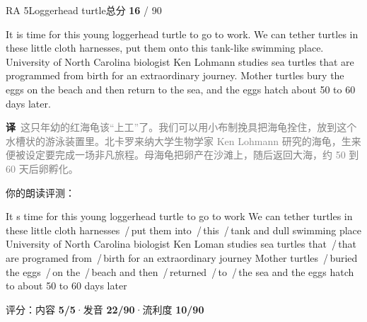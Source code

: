 \documentclass[11pt]{article}
\newcommand{\sfull}[1]{\textcolor{cFix}{\bfseries #1}}     %
\newcommand{\spart}[1]{\textcolor{cPartial}{\bfseries #1}} %
\newcommand{\szero}[1]{\textcolor{cWrong}{\bfseries #1}}   %
\newcommand{\sg}[1]{\textcolor{cSpkGood}{#1}}   %
\newcommand{\sy}[1]{\textcolor{cSpkOk}{#1}}     %
\newcommand{\sr}[1]{\textcolor{cSpkBad}{#1}}    %
\newcommand{\pse}{{\color{gray}\,/\,}}          %
\newcommand{\zh}[1]{{\footnotesize\textcolor{cNote}{\textbf{译}}\ \textcolor{gray}{#1}}}
\begin{document}
\begin{qblock}{RA 5\quad Loggerhead turtle}{总分 \textcolor{cAccent}{\bfseries 16} / 90}
\begin{promptbox}
It is time for this young loggerhead turtle to go to work. We can tether turtles in these little cloth harnesses, put them onto this tank-like swimming place. University of North Carolina biologist Ken Lohmann studies sea turtles that are programmed from birth for an extraordinary journey. Mother turtles bury the eggs on the beach and then return to the sea, and the eggs hatch about 50 to 60 days later.
\end{promptbox}
\zh{这只年幼的红海龟该“上工”了。我们可以用小布制挽具把海龟拴住，放到这个水槽状的游泳装置里。北卡罗来纳大学生物学家 Ken Lohmann 研究的海龟，生来便被设定要完成一场非凡旅程。母海龟把卵产在沙滩上，随后返回大海，约 50 到 60 天后卵孵化。}
\smallskip\par{\footnotesize\color{gray}你的朗读评测：}
\begin{asrbox}
\sy{It s time for this young} \sy{loggerhead} \sg{turtle to go to work} \sg{We can} \sr{tether} \sg{turtles in these little} \sy{cloth harnesses} \pse \sy{put them into} \pse \sy{this} \pse \sy{tank and dull} \sg{swimming place University of} \sg{North Carolina biologist Ken Loman} \sg{studies} \sg{sea turtles that} \pse \sy{that are programed from} \pse \sg{birth for an} \sg{extraordinary journey Mother turtles} \pse \sy{buried the} \sg{eggs} \pse \sg{on the} \pse \sg{beach and then} \pse \sr{returned} \pse \sg{to} \pse \sg{the sea and the eggs hatch to} \sg{about 50 to 60 days later}
\end{asrbox}
{\small 评分：内容 \sfull{5/5}\quad·\quad 发音 \spart{22/90}\quad·\quad 流利度 \szero{10/90}}
\end{qblock}
\end{document}
